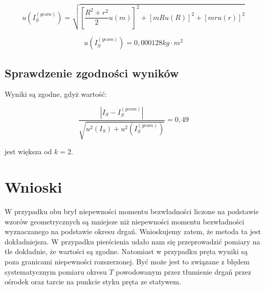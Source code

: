 \documentclass[a4paper,10pt,twoside]{article}
\begin{document}
$$ u(I_S^{(geom)}) = \sqrt{ \left[ \frac{R^2 + r^2}{2} u(m) \right]^2 + \left[ mRu(R) \right]^2 + \left[ mru(r) \right]^2 } $$


$$ u(I_S^{(geom)}) = 0,000128 \unit{kg \cdot m^2} $$

\subsection{Sprawdzenie zgodności wyników}

Wyniki są zgodne, gdyż wartość:

$$ \frac{ \left| I_S - I_S^{(geom)} \right| }{\sqrt{u^2(I_S) + u^2(I_S^{(geom)})}} = 0,49 $$

jest większa od $k = 2$.


\section{Wnioski}

W przypadku obu brył niepewności momentu bezwładności liczone na podstawie wzorów geometrycznych są mniejsze niż niepewności momentu bezwładności wyznaczanego na podstawie okresu drgań. Wnioskujemy zatem, że metoda ta jest dokładniejsza. W przypadku pierścienia udało nam się przeprowadzić pomiary na tle dokładnie, że wartości są zgodne. Natomiast w przypadku pręta wyniki są poza granicami niepewności rozszerzonej. Być może jest to związane z błędem systematycznym pomiaru okresu $T$ powodowanym przez tłumienie drgań przez ośrodek oraz tarcie na punkcie styku pręta ze statywem.
\end{document}
